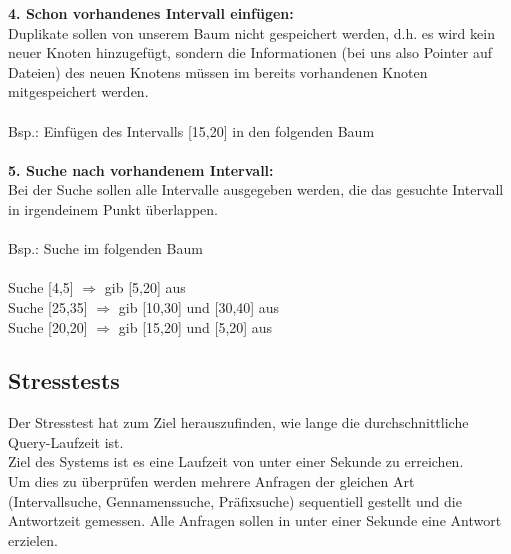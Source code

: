 \textbf{4. Schon vorhandenes Intervall einfügen:}\\
Duplikate sollen von unserem Baum nicht gespeichert werden, d.h. es wird kein neuer Knoten hinzugefügt, sondern die Informationen (bei uns also Pointer auf Dateien) des neuen Knotens müssen im bereits vorhandenen Knoten mitgespeichert werden.\\\\
Bsp.: Einfügen des Intervalls [15,20] in den folgenden Baum\\\\
\textbf{5. Suche nach vorhandenem Intervall:}\\
Bei der Suche sollen alle Intervalle ausgegeben werden, die das gesuchte Intervall in irgendeinem Punkt überlappen.\\\\
Bsp.: Suche im folgenden Baum\\\\
Suche [4,5] $\Rightarrow$ gib [5,20] aus\\
Suche [25,35] $\Rightarrow$ gib [10,30] und [30,40] aus\\
Suche [20,20] $\Rightarrow$ gib [15,20] und [5,20] aus
\subsection{Stresstests}
Der Stresstest hat zum Ziel herauszufinden, wie lange die durchschnittliche Query-Laufzeit ist.\\
Ziel des Systems ist es eine Laufzeit von unter einer Sekunde zu erreichen.\\
Um dies zu überprüfen werden mehrere Anfragen der gleichen Art (Intervallsuche, Gennamenssuche, Präfixsuche) sequentiell gestellt und die Antwortzeit gemessen. Alle Anfragen sollen in unter einer Sekunde eine Antwort erzielen.

